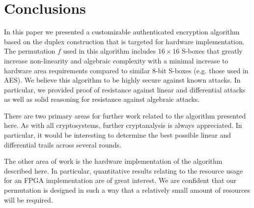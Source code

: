 \section{Conclusions}
In this paper we presented a customizable authenticated encryption algorithm based on the duplex construction that is targeted for hardware implementation.
The permutation $f$ used in this algorithm includes $16 \times 16$ S-boxes that greatly increase non-linearity and algebraic complexity with a minimal increase to hardware area requirements compared to similar $8$-bit S-boxes (e.g. those used in AES).
We believe this algorithm to be highly secure against known attacks.
In particular, we provided proof of resistance against linear and differential attacks as well as solid reasoning for resistance against algebraic attacks.

There are two primary areas for further work related to the algorithm presented here.
As with all cryptosystems, further cryptanalysis is always appreciated.
In particular, it would be interesting to determine the best possible linear and differential trails across several rounds.

The other area of work is the hardware implementation of the algorithm described here.
In particular, quantitative results relating to the resource usage for an FPGA implementation are of great interest.
We are confident that our permutation is designed in such a way that a relatively small amount of resources will be required.

\begin{comment}
In addition to further cryptanalysis, more analysis should be performed on similar $2 \times 2$ matrices so that a list of drop-in replacements within our security margin is readily available.
It is desirable to perform statistical analysis on the remaining $16$-bit S-boxes provided by Wood.
Knowing their maximum linear biases and differential probabilities would likely allow them to act as drop-in replacements.
Until then, we have provided users with references to the tools required for such analysis.
\end{comment}

